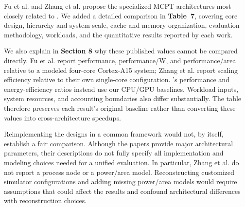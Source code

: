Fu et al. and Zhang et al. propose the specialized MCPT architectures most closely related to \name. We added a detailed comparison in \textbf{Table~7}, covering core design, hierarchy and system scale, cache and memory organization, evaluation methodology, workloads, and the quantitative results reported by each work.

We also explain in \textbf{Section 8} why these published values cannot be compared directly. Fu et al. report performance, performance/W, and performance/area relative to a modeled four-core Cortex-A15 system; Zhang et al. report scaling efficiency relative to their own single-core configuration. \name's performance and energy-efficiency ratios instead use our CPU/GPU baselines. Workload inputs, system resources, and accounting boundaries also differ substantially. The table therefore preserves each result's original baseline rather than converting these values into cross-architecture speedups.

Reimplementing the designs in a common framework would not, by itself, establish a fair comparison. Although the papers provide major architectural parameters, their descriptions do not fully specify all implementation and modeling choices needed for a unified evaluation. In particular, Zhang et al. do not report a process node or a power/area model. Reconstructing customized simulator configurations and adding missing power/area models would require assumptions that could affect the results and confound architectural differences with reconstruction choices.


\par
\begin{manuscriptexcerpt}
  
\end{manuscriptexcerpt}

